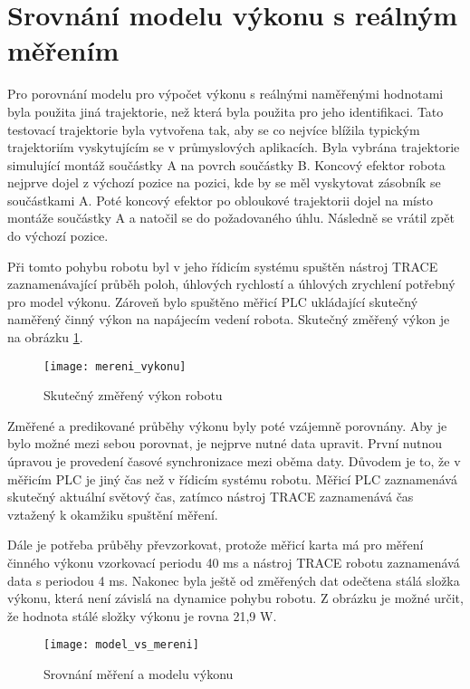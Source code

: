 \section{Srovnání modelu výkonu s reálným měřením}

Pro porovnání modelu pro výpočet výkonu s reálnými naměřenými hodnotami byla použita jiná trajektorie, než která byla použita pro jeho identifikaci. Tato testovací trajektorie byla vytvořena tak, aby se co nejvíce blížila typickým trajektoriím vyskytujícím se v průmyslových aplikacích. Byla vybrána trajektorie simulující montáž součástky A na povrch součástky B. Koncový efektor robota nejprve dojel z výchozí pozice na pozici, kde by se měl vyskytovat zásobník se součástkami A. Poté koncový efektor po obloukové trajektorii dojel na místo montáže součástky A a natočil se do požadovaného úhlu. Následně se vrátil zpět do výchozí pozice.

Při tomto pohybu robotu byl v jeho řídicím systému spuštěn nástroj TRACE zaznamenávající průběh poloh, úhlových rychlostí a úhlových zrychlení potřebný pro model výkonu. Zároveň bylo spuštěno měřicí PLC ukládající skutečný naměřený činný výkon na napájecím vedení robota. Skutečný změřený výkon je na obrázku \ref{mereni_vykonu_pic}.

\begin{figure}[h!]
\texttt{[image: mereni\_vykonu]}
\caption{Skutečný změřený výkon robotu}
\label{mereni_vykonu_pic}
\end{figure}

Změřené a predikované průběhy výkonu byly poté vzájemně porovnány. Aby je bylo možné mezi sebou porovnat, je nejprve nutné data upravit. První nutnou úpravou je provedení časové synchronizace mezi oběma daty. Důvodem je to, že v měřicím PLC je jiný čas než v řídicím systému robotu. Měřicí PLC zaznamenává skutečný aktuální světový čas, zatímco nástroj TRACE zaznamenává čas vztažený k okamžiku spuštění měření. 

Dále je potřeba průběhy převzorkovat, protože měřicí karta má pro měření činného výkonu vzorkovací periodu 40 ms a nástroj TRACE robotu zaznamenává data s periodou 4 ms. Nakonec byla ještě od změřených dat odečtena stálá složka výkonu, která není závislá na dynamice pohybu robotu. Z obrázku je možné určit, že hodnota stálé složky výkonu je rovna 21,9 W.

\begin{figure}[h!]
\texttt{[image: model\_vs\_mereni]}
\caption{Srovnání měření a modelu výkonu}
\label{model_vs_mereni_pic}
\end{figure}

